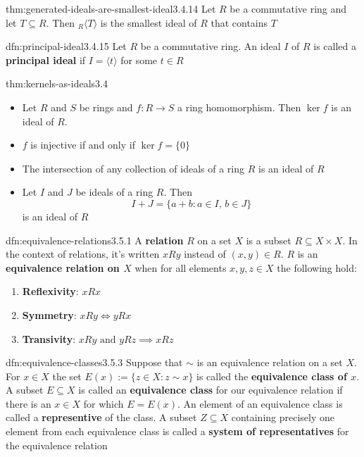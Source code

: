 \documentclass[landscape, 8pt]{extarticle}
\begin{document}
\begin{multicols}{3}
\begin{thm}[]{thm:generated-ideals-are-smallest-ideal}{3.4.14}
    Let $R$ be a commutative ring and let $T\subseteq R$. Then ${}_{R}\langle T \rangle$ is the smallest ideal of $R$ that contains $T$
\end{thm}

\begin{dfn}{dfn:principal-ideal}{3.4.15}
    Let $R$ be a commutative ring. An ideal $I$ of $R$ is called a \textbf{principal ideal} if $I = \langle t \rangle$ for some $t\in R$
\end{dfn}

\begin{thm}{thm:kernels-as-ideals}{3.4}

    \begin{itemize}
        \setlength\itemsep{0em}
        \item[\textbf{3.4.18}] Let $R$ and $S$ be rings and $f : R\to S$ a ring homomorphism. Then $\ker f$ is an ideal of $R$.
        \item[\textbf{3.4.20}] $f$ is injective if and only if $\ker f = \{0\}$
        \item[\textbf{3.4.21}] The intersection of any collection of ideals of a ring $R$ is an ideal of $R$
        \item[\textbf{3.4.22}] Let $I$ and $J$ be ideals of a ring $R$. Then
            \[I + J = \{a + b : a\in I,\, b\in J\}\]
            is an ideal of $R$
    \end{itemize}
\end{thm}


\begin{dfn}{dfn:equivalence-relations}{3.5.1}
    A \textbf{relation} $R$ on a set $X$ is a subset $R \subseteq X \times X $. In the context of relations, it's written $xRy$ instead of $(x,y)\in R$. $R$ is an \textbf{equivalence relation on $X$} when for all elements $x, y, z\in X$ the following hold:
    \begin{enumerate}
        \setlength\itemsep{0em}
        \item \textbf{Reflexivity}: $xRx$
        \item \textbf{Symmetry}: $xRy \iff yRx$
        \item \textbf{Transivity}: $xRy \text{ and } yRz \implies xRz$
    \end{enumerate}
\end{dfn}

\begin{dfn}{dfn:equivalence-classes}{3.5.3}
    Suppose that $\sim$ is an equivalence relation on a set $X$. For $x\in X$ the set $E(x) := \{z\in X : z \sim x\}$ is called the \textbf{equivalence class of $x$}. A subset $E \subseteq X$ is called an \textbf{equivalence class} for our equivalence relation if there is an $x\in X$ for which $E = E(x)$. An element of an equivalence class is called a \textbf{representive} of the class. A subset $Z \subseteq X$ containing precisely one element from each equivalence class is called a \textbf{system of representatives} for the equivalence relation
\end{dfn}


\end{multicols}
\end{document}
